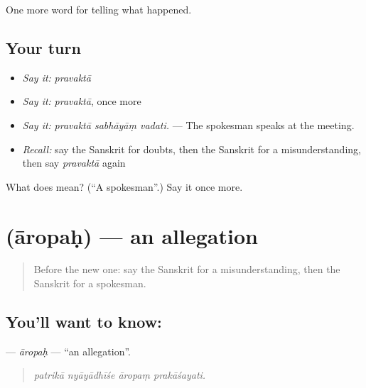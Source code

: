\begin{grammarlens}[title={What you've built}]
One more word for telling what happened.
\end{grammarlens}

\subsection*{Your turn}
\begin{itemize}
\raggedright
  \item \emph{Say it:} \emph{pravaktā}
  \item \emph{Say it:} \emph{pravaktā}, once more
  \item \emph{Say it:} \emph{pravaktā sabhāyāṃ vadati.} — The spokesman speaks at the meeting.
  \item \emph{Recall:} say the Sanskrit for doubts, then the Sanskrit for a misunderstanding, then say \emph{pravaktā} again
\end{itemize}

\begin{tcolorbox}[breakable,colback=teal!4,colframe=teal!35!black,title={Before you move on}]
What does  mean? (\textquotedblleft{}A spokesman\textquotedblright{}.) Say it once more.
\end{tcolorbox}
\section[\texorpdfstring{\sk{आरोपः} (āropaḥ)}{आरोपः (āropaḥ)}]{ (āropaḥ) — an allegation}

\label{lesson:SA-C312-aropah}



\begin{quote}
Before the new one: say the Sanskrit for a misunderstanding, then the Sanskrit for a spokesman.
\end{quote}

\subsection*{You'll want to know: }
\textbf{} — \emph{āropaḥ} — \textquotedblleft{}an allegation\textquotedblright{}.

\begin{quote}
   
\end{quote}

\begin{quote}
\emph{patrikā nyāyādhīśe āropaṃ prakāśayati.}
\end{quote}

